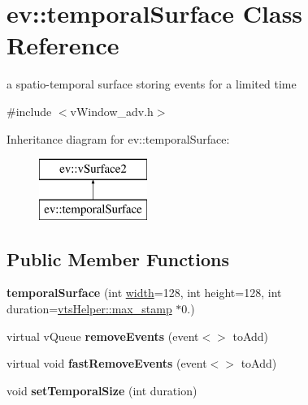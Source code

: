 \hypertarget{classev_1_1temporalSurface}{}\section{ev\+:\+:temporal\+Surface Class Reference}
\label{classev_1_1temporalSurface}


a spatio-\/temporal surface storing events for a limited time  




{\ttfamily \#include $<$v\+Window\+\_\+adv.\+h$>$}

Inheritance diagram for ev\+:\+:temporal\+Surface\+:\begin{figure}[H]
\begin{center}
\leavevmode
\includegraphics[height=2.000000cm]{classev_1_1temporalSurface}
\end{center}
\end{figure}
\subsection*{Public Member Functions}
\begin{DoxyCompactItemize}
\item 
{\bfseries temporal\+Surface} (int \hyperlink{classev_1_1vSurface2_a1aa8027816352a15d5b9bf1f26f48e76}{width}=128, int height=128, int duration=\hyperlink{classev_1_1vtsHelper_a059fdcf455b471e69446e565ed017f65}{vts\+Helper\+::max\+\_\+stamp} $\ast$0.)\hypertarget{classev_1_1temporalSurface_a4edd1c4808e7cf2198217bd7637cb7b1}{}\label{classev_1_1temporalSurface_a4edd1c4808e7cf2198217bd7637cb7b1}

\item 
virtual v\+Queue {\bfseries remove\+Events} (event$<$$>$ to\+Add)\hypertarget{classev_1_1temporalSurface_a358c548e6727aa89d908e61ad948b1ca}{}\label{classev_1_1temporalSurface_a358c548e6727aa89d908e61ad948b1ca}

\item 
virtual void {\bfseries fast\+Remove\+Events} (event$<$$>$ to\+Add)\hypertarget{classev_1_1temporalSurface_a78a9bb93145915a90a5105bab812bb65}{}\label{classev_1_1temporalSurface_a78a9bb93145915a90a5105bab812bb65}

\item 
void {\bfseries set\+Temporal\+Size} (int duration)\hypertarget{classev_1_1temporalSurface_a35d4b67c18393961fa833d330a040e80}{}\label{classev_1_1temporalSurface_a35d4b67c18393961fa833d330a040e80}

\end{DoxyCompactItemize}

